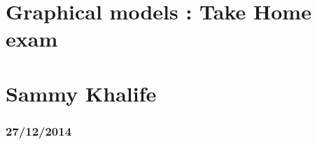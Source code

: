 
\geometry{hmargin=2.5cm,vmargin=2cm}   


\section*{Graphical models : Take Home exam}
\section*{Sammy Khalife}
\subsubsection*{27/12/2014}

%


